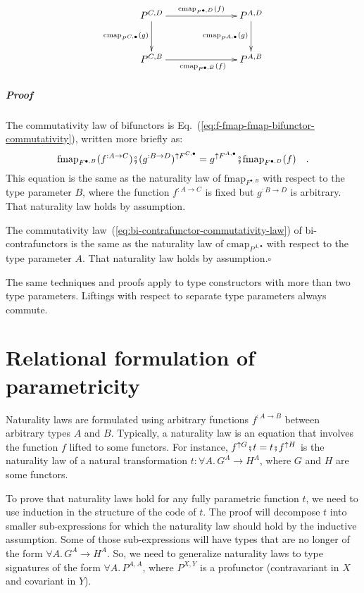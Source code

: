 \begin{wrapfigure}{l}{0.37\columnwidth}%
\vspace{-1.7\baselineskip}
\[
\xymatrix{\xyScaleY{2.5pc}\xyScaleX{6.0pc}P^{C,D}\ar[r]\sp(0.55){\text{cmap}_{P^{\bullet,D}}(f)~~~}\ar[d]\sb(0.45){\text{cmap}_{P^{C,\bullet}}(g)} & P^{A,D}\ar[d]\sb(0.45){\text{cmap}_{P^{A,\bullet}}(g)}\\
P^{C,B}\ar[r]\sb(0.45){~~~~\text{cmap}_{P^{\bullet,B}}(f)} & P^{A,B}
}
\]

\vspace{-1.7\baselineskip}
\end{wrapfigure}%


\subparagraph{Proof}

The commutativity law of bifunctors is Eq.~(\ref{eq:f-fmap-fmap-bifunctor-commutativity}),
written more briefly as:
\[
\text{fmap}_{F^{\bullet,B}}(f^{:A\rightarrow C})\bef(g^{:B\rightarrow D})^{\uparrow F^{C,\bullet}}=g^{\uparrow F^{A,\bullet}}\bef\text{fmap}_{F^{\bullet,D}}(f)\quad.
\]
This equation is the same as the naturality law of $\text{fmap}_{F^{\bullet,B}}$
with respect to the type parameter $B$, where the function $f^{:A\rightarrow C}$
is fixed but $g^{:B\rightarrow D}$ is arbitrary. That naturality
law holds by assumption.

The commutativity law~(\ref{eq:bi-contrafunctor-commutativity-law})
of bi-contrafunctors is the same as the naturality law of $\text{cmap}_{P^{A,\bullet}}$
with respect to the type parameter $A$. That naturality law holds
by assumption.$\square$

The same techniques and proofs apply to type constructors with more
than two type parameters. Liftings with respect to separate type
parameters always commute.

\section{Relational formulation of parametricity\label{sec:Parametricity-theorem-for-relations}\label{subsec:Relations-between-types}}

Naturality laws are formulated using arbitrary functions $f^{:A\rightarrow B}$
between arbitrary types $A$ and $B$. Typically, a naturality law
is an equation that involves the function $f$ lifted to some functors.
For instance, $f^{\uparrow G}\bef t=t\bef f^{\uparrow H}$ is the
naturality law of a natural transformation $t:\forall A.\,G^{A}\rightarrow H^{A}$,
where $G$ and $H$ are some functors.

To prove that naturality laws hold for any fully parametric function
$t$, we need to use induction in the structure of the code of $t$.
The proof will decompose $t$ into smaller sub-expressions for which
the naturality law should hold by the inductive assumption. Some of
those sub-expressions will have types that are no longer of the form
$\forall A.\,G^{A}\rightarrow H^{A}$. So, we need to generalize naturality
laws to type signatures of the form $\forall A.\,P^{A,A}$, where
$P^{X,Y}$ is a profunctor (contravariant in $X$ and covariant in
$Y$). 

